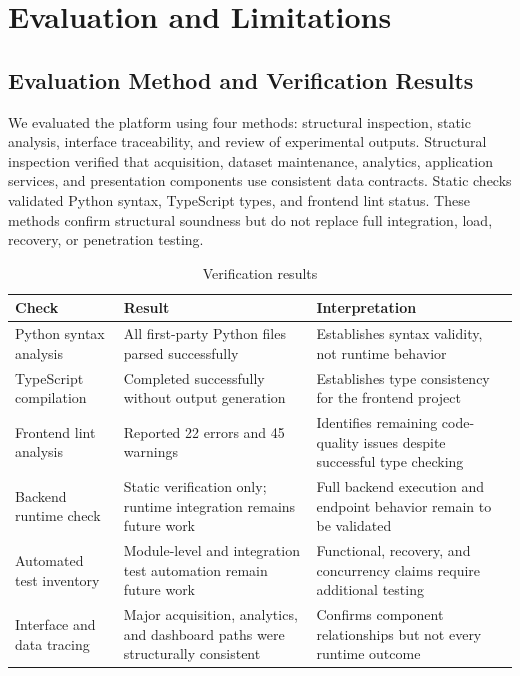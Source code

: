
\chapter{Evaluation and Limitations}
\label{chap:verification-security-discussion}

\section{Evaluation Method and Verification Results}
\label{sec:verification-method}

We evaluated the platform using four methods: structural inspection, static
analysis, interface traceability, and review of experimental outputs.
Structural inspection verified that acquisition, dataset maintenance, analytics,
application services, and presentation components use consistent data
contracts. Static checks validated Python syntax, TypeScript types, and
frontend lint status. These methods confirm structural soundness but do not
replace full integration, load, recovery, or penetration testing.

\begin{table}[H]
  \centering
  \small
  \setlength{\tabcolsep}{4pt}
  \caption{Verification results}
  \label{tab:verification-results}
  \begin{tabularx}{\textwidth}{@{}>{\RaggedRight\arraybackslash}p{}>{\RaggedRight\arraybackslash}p{}Y@{}}
    \toprule
    \textbf{Check} & \textbf{Result} & \textbf{Interpretation} \\
    \midrule
    Python syntax analysis & All first-party Python files parsed successfully & Establishes syntax validity, not runtime behavior \\
    TypeScript compilation & Completed successfully without output generation & Establishes type consistency for the frontend project \\
    Frontend lint analysis & Reported 22 errors and 45 warnings & Identifies remaining code-quality issues despite successful type checking \\
    Backend runtime check & Static verification only; runtime integration remains future work & Full backend execution and endpoint behavior remain to be validated \\
    Automated test inventory & Module-level and integration test automation remain future work & Functional, recovery, and concurrency claims require additional testing \\
    Interface and data tracing & Major acquisition, analytics, and dashboard paths were structurally consistent & Confirms component relationships but not every runtime outcome \\
    \bottomrule
  \end{tabularx}
\end{table}

